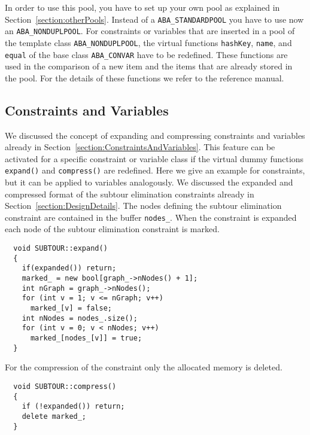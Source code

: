 In order to use this pool, you have to set up your own pool as
explained in Section~\ref{section:otherPools}. Instead of a
{\tt ABA\_STANDARDPOOL} you have to use now an {\tt ABA\_NONDUPLPOOL}. 
For constraints or variables that are inserted in a pool of the
template class {\tt ABA\_NONDUPLPOOL}, the virtual functions {\tt hashKey},
{\tt name}, and {\tt equal} of the base class {\tt ABA\_CONVAR} have to be
redefined. These functions are used in the comparison of a new item and
the items that are already stored in the pool. For the details of
these functions we refer to the reference manual.


\subsection{Constraints and Variables}

We discussed the concept of expanding and compressing constraints
and variables already in
Section~\ref{section:ConstraintsAndVariables}. 
This feature can be activated
for a specific constraint or variable class if the virtual dummy functions
{\tt expand()}
and {\tt compress()}
are redefined. Here we give an
example for constraints, but it can be applied to variables analogously.
We discussed the expanded and compressed format of the subtour elimination
constraints
already in Section~\ref{section:DesignDetails}. 
The nodes defining the subtour
elimination constraint are
contained in the buffer {\tt nodes\_}. When the constraint is expanded 
each node of the subtour elimination constraint is marked.
\begin{verbatim} 
  void SUBTOUR::expand()
  {
    if(expanded()) return;
    marked_ = new bool[graph_->nNodes() + 1];
    int nGraph = graph_->nNodes();
    for (int v = 1; v <= nGraph; v++)
      marked_[v] = false;
    int nNodes = nodes_.size();
    for (int v = 0; v < nNodes; v++)
      marked_[nodes_[v]] = true;
  }
\end{verbatim}
For the compression of the constraint only the allocated memory is
deleted.
\begin{verbatim}
  void SUBTOUR::compress()
  {
    if (!expanded()) return;
    delete marked_;
  }
\end{verbatim}

